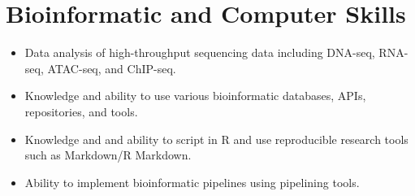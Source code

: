 \documentclass[letterpaper, 10pt]{article}
\begin{document}

\section*{Bioinformatic and Computer Skills}

\begin{itemize}
   \setlength\itemsep{0em}
   \item Data analysis of high-throughput sequencing data including DNA-seq, RNA-seq, ATAC-seq, and ChIP-seq.
   \item Knowledge and ability to use various bioinformatic databases, APIs, repositories, and tools.
   \item Knowledge and and ability to script in R and use reproducible research tools such as Markdown/R Markdown.
   \item Ability to implement bioinformatic pipelines using pipelining tools.
\end{itemize}



\end{document}
